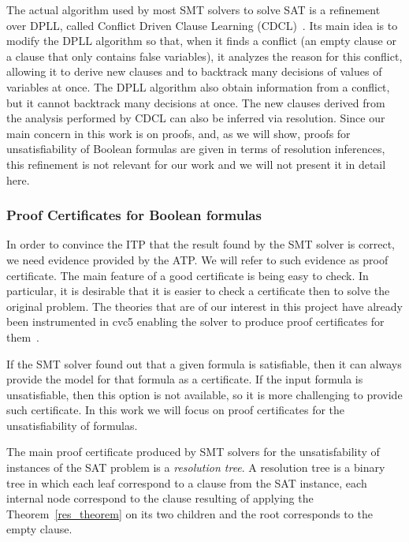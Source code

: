The actual algorithm used by most SMT solvers to solve SAT is a refinement over DPLL, called Conflict Driven Clause Learning (CDCL)~\cite{cdcl}. Its main idea is to modify the DPLL algorithm so that, when it finds a conflict (an empty clause or a clause that only contains false variables), it analyzes the reason for this conflict, allowing it to derive new clauses and to backtrack many decisions of values of variables at once.
The DPLL algorithm also obtain information from a conflict, but it cannot backtrack many decisions at once.
The new clauses derived from the analysis performed by CDCL can also be inferred via resolution.
Since our main concern in this work is on proofs, and, as we will show, proofs for unsatisfiability
of Boolean formulas are given in terms of resolution inferences, this refinement is not relevant
for our work and we will not present it in detail here.

\subsubsection{Proof Certificates for Boolean formulas}\label{sec:pcBool}

In order to convince the ITP that the result found by the SMT solver is correct, we need evidence provided by the
ATP.
%
We will refer to such evidence as proof certificate.
%
The main feature of a good certificate is being easy to check.
%
In particular, it is desirable that it is easier to check a certificate then to solve the original problem.
%
The theories that are of our interest in this project have already been instrumented in cvc5 enabling the solver to produce proof certificates for them~\cite{Barbosa2022}.

If the SMT solver found out that a given formula is satisfiable, then it can always provide the model for that formula as a certificate. If the input formula is unsatisfiable, then this option is not available, so it is more challenging to provide such certificate. In this work we will focus on proof certificates for the unsatisfiability of formulas.

The main proof certificate produced by SMT solvers for the unsatisfability of instances of the SAT problem is
a \textit{resolution tree}. A resolution tree is a binary tree in which each leaf correspond to a clause from the SAT instance, each internal node correspond to the clause resulting of applying the Theorem~\ref{res_theorem} on its two children and the root corresponds to the empty clause.


